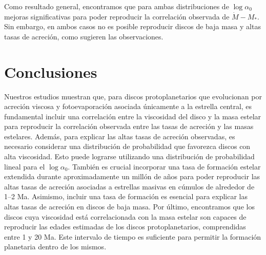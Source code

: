 \documentclass[baaa]{baaa}
\begin{document}
Como resultado general, encontramos que para ambas distribuciones de $\log \alpha_0$ mejoras significativas para poder reproducir la correlación observada de $\dot{M} - M_{*}$. Sin embargo, en ambos casos no es posible reproducir discos de baja masa y altas tasas de acreción, como sugieren las observaciones. 


\section{Conclusiones} \label{ref}

Nuestros estudios muestran que, para discos protoplanetarios que evolucionan por acreción viscosa y fotoevaporación asociada únicamente a la estrella central, es fundamental incluir una correlación entre la viscosidad del disco y la masa estelar para reproducir la correlación observada entre las tasas de acreción y las masas estelares.
Además, para explicar las altas tasas de acreción observadas, es necesario considerar una distribución de probabilidad que favorezca discos con alta viscosidad. Esto puede lograrse utilizando una distribución de probabilidad lineal para el $\log \alpha_0$. También es crucial incorporar una tasa de formación estelar extendida durante aproximadamente un millón de años para poder reproducir las altas tasas de acreción asociadas a estrellas masivas en cúmulos de alrededor de 1--2 Ma. Asimismo, incluir una tasa de formación es esencial para explicar las altas tasas de acreción en discos de baja masa.
Por último, encontramos que los discos cuya viscosidad está correlacionada con la masa estelar son capaces de reproducir las edades estimadas de los discos protoplanetarios, comprendidas entre 1 y 20 Ma. Este intervalo de tiempo es suficiente para permitir la formación planetaria dentro de los mismos.


\small

 
\end{document}
